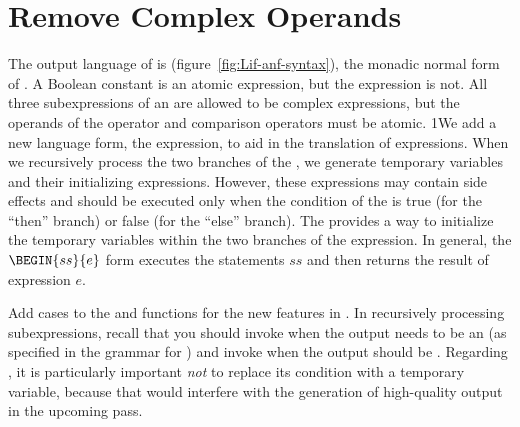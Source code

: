 \documentclass[7x10]{TimesAPriori_MIT}%
\def\pythonEd{1}
\def\edition{1}
\newcommand{\pythonColor}[0]{}
\newcommand{\python}[1]{{\if\edition\pythonEd\pythonColor #1\fi}}
\numberwithin{theorem}{chapter}
\numberwithin{definition}{chapter}
\numberwithin{equation}{chapter}
\begin{document}
\section{Remove Complex Operands}
\label{sec:remove-complex-opera-Lif}

The output language of  is
\LangIfANF{} (figure~\ref{fig:Lif-anf-syntax}), the monadic
normal form of \LangIf{}.  A Boolean constant is an atomic expression,
but the  expression is not.  All three subexpressions of an
 are allowed to be complex expressions, but the operands of
the  operator and comparison operators must be atomic.
%
\python{We add a new language form, the  expression, to aid
  in the translation of \code{if} expressions. When we recursively
  process the two branches of the \code{if}, we generate temporary
  variables and their initializing expressions. However, these
  expressions may contain side effects and should be executed only
  when the condition of the \code{if} is true (for the ``then''
  branch) or false (for the ``else'' branch). The \code{Begin} provides
  a way to initialize the temporary variables within the two branches
  of the \code{if} expression.  In general, the $\BEGIN{ss}{e}$
  form executes the statements $ss$ and then returns the result of
  expression $e$.}

Add cases to the  and  functions for
the new features in \LangIf{}. In recursively processing
subexpressions, recall that you should invoke  when
the output needs to be an \Atm{} (as specified in the grammar for
\LangIfANF{}) and invoke  when the output should be
\Exp{}.  Regarding , it is particularly important 
\emph{not} to replace its condition with a temporary variable, because
that would interfere with the generation of high-quality output in the
upcoming  pass.

\newcommand{\LifMonadASTRacket}{
\begin{array}{rcl}
\Atm &::=& \BOOL{\itm{bool}}\\
\Exp &::=& \UNIOP{\key{not}}{\Atm} 
     \MID \BINOP{\itm{cmp}}{\Atm}{\Atm} 
     \MID \IF{\Exp}{\Exp}{\Exp} 
\end{array}
}
  
\newcommand{\LifMonadASTPython}{
\begin{array}{rcl}
\Atm &::=& \BOOL{\itm{bool}}\\
\Exp &::=& \CMP{\Atm}{\itm{cmp}}{\Atm} \MID \IF{\Exp}{\Exp}{\Exp} \\
  &\MID& \BEGIN{\Stmt^{*}}{\Exp}\\
\Stmt{} &::=& \IFSTMT{\Exp}{\Stmt^{*}}{\Stmt^{*}}
\end{array}
}
\end{document}
